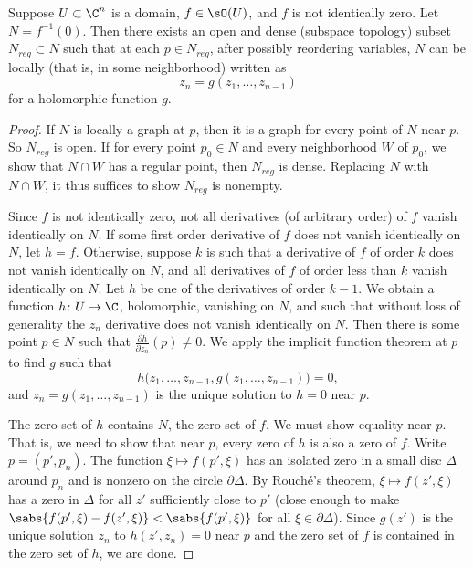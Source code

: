 \begin{theorem}\label{regptsdense}
Suppose $U\subset\C^n$ is a domain, $f\in\sO(U)$, and $f$ is not identically zero. Let $N=f^{-1}(0)$. Then there exists an open and dense (subspace topology) subset $N_{\mathit{reg}}\subset N$ such that at each $p\in N_{\mathit{reg}}$, after possibly reordering variables, $N$ can be locally (that is, in some neighborhood) written as
\[z_n=g(z_1,\ldots,z_{n-1})\]
for a holomorphic function $g$.
\end{theorem}
\begin{proof}
If $N$ is locally a graph at $p$, then it is a graph for every point of $N$ near $p$. So $N_{\mathit{reg}}$ is open. If for every point $p_0\in N$ and every neighborhood $W$ of $p_0$, we show that $N\cap W$ has a regular point, then $N_{\mathit{reg}}$ is dense. Replacing $N$ with $N\cap W$, it thus suffices to show $N_{\mathit{reg}}$ is nonempty.

Since $f$ is not identically zero, not all derivatives (of arbitrary order) of $f$ vanish identically on $N$. If some first order derivative of $f$ does not vanish identically on $N$, let $h=f$. Otherwise, suppose $k$ is such that a derivative of $f$ of order $k$ does not vanish identically on $N$, and all derivatives of $f$ of order less than $k$ vanish identically on $N$. Let $h$ be one of the derivatives of order $k-1$. We obtain a function $h\colon U\to\C$, holomorphic, vanishing on $N$, and such that without loss of generality the $z_n$ derivative does not vanish identically on $N$. Then there is some point $p\in N$ such that $\frac{\partial h}{\partial z_n}(p)\ne0$. We apply the implicit function theorem at $p$ to find $g$ such that
\[h\bigl(z_1,\ldots,z_{n-1},g(z_1,\ldots,z_{n-1})\bigr)=0,\]
and $z_n=g(z_1,\ldots,z_{n-1})$ is the unique solution to $h=0$ near $p$.

The zero set of $h$ contains $N$, the zero set of $f$. We must show equality near $p$. That is, we need to show that near $p$, every zero of $h$ is also a zero of $f$. Write $p=(p',p_n)$. The function $\xi\mapsto f(p',\xi)$ has an isolated zero in a small disc $\Delta$ around $p_n$ and is nonzero on the circle $\partial\Delta$. By Rouch\'e's theorem, $\xi\mapsto f(z',\xi)$ has a zero in $\Delta$ for all $z'$ sufficiently close to $p'$ (close enough to make $\sabs{f(p',\xi)-f(z',\xi)}<\sabs{f(p',\xi)}$ for all $\xi\in\partial\Delta$). Since $g(z')$ is the unique solution $z_n$ to $h(z',z_n)=0$ near $p$ and the zero set of $f$ is contained in the zero set of $h$, we are done.
\end{proof}
